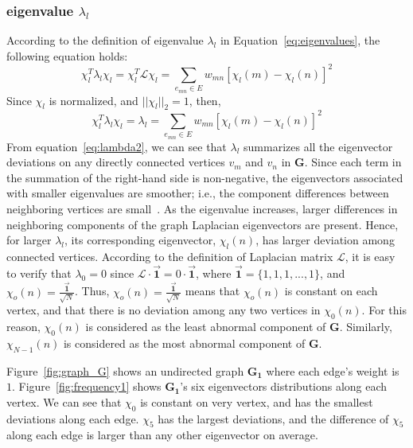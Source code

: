 \subsubsection{eigenvalue $\lambda_l$}
According to the definition of eigenvalue $\lambda_l$  in Equation~\ref{eq:eigenvalues}, the following equation holds:
\begin{equation}
\label{eq:lambda1}
\chi_{l}^T\lambda_{l}\chi_{l}=\chi_{l}^T\mathcal{L}\chi_{l}= \sum_{e_{mn}\in E} w_
{mn}[\chi_{l}(m)-\chi_{l}(n)]^2
\end{equation}Since $\chi_{l}$ is normalized, and $||\chi_{l}||_2 =1$, then,
\begin{equation}
\label{eq:lambda2}
\chi_{l}^T\lambda_{l}\chi_{l}=\lambda_l= \sum_{e_{mn}\in E} w_
{mn}[\chi_{l}(m)-\chi_{l}(n)]^2
\end{equation}
From equation~\ref{eq:lambda2}, we can see that $\lambda_l$ summarizes all the eigenvector deviations on any directly connected vertices $v_m$ and $v_n$ in $\mathbf{G}$. Since each term in the summation of the right-hand side is non-negative, the eigenvectors associated with smaller eigenvalues are smoother; i.e., the component differences between neighboring vertices are
small~\cite{shuman2015vertex}. As the eigenvalue increases, larger differences in neighboring
components of the graph Laplacian eigenvectors are present.
Hence, for larger $\lambda_l$, its corresponding eigenvector, $\chi_l(n)$, has larger deviation among connected vertices. According to the definition of Laplacian matrix $\mathcal{L}$, it is easy to verify that $\lambda_0=0$ since $\mathcal{L}\cdot\vec{\textbf{1}}= 0\cdot\vec{\textbf{1}}$, where $\vec{\textbf{1}}=\{1,1,1,...,1\}$, and $\chi_o(n)=\frac{\vec{\textbf{1}}}{\sqrt{N}}$. Thus, $\chi_o(n)=\frac{\vec{\textbf{1}}}{\sqrt{N}}$ means that $\chi_o(n)$ is constant on each vertex, and that
there is no deviation among any two vertices in $\chi_0(n)$. For this reason, $\chi_0(n)$ is considered as the least abnormal component of $\mathbf{G}$. Similarly, $\chi_{N-1}(n)$ is considered as the most abnormal component of $\mathbf{G}$.

Figure~\ref{fig:graph_G} shows an undirected graph $\mathbf{G_1}$ where each edge's weight is $1$. Figure~\ref{fig:frequency1} shows  $\mathbf{G_1}$'s six eigenvectors distributions along each vertex. We can see that
$\chi_0$ is constant on very vertex, and has the smallest deviations along each edge. $\chi_5$ has the largest deviations, and the difference of $\chi_5$ along each edge is larger than any other eigenvector on average.



